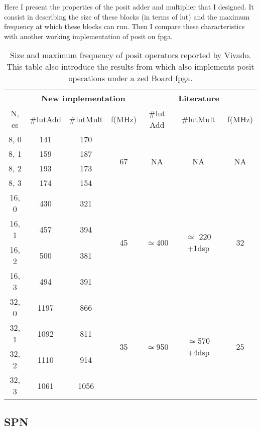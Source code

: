 Here I present the properties of the posit adder and multiplier that I designed. It consist in describing the size of these blocks (in terms of \gls{lut}) and the maximum frequency at which these blocks can run. Then I compare these characteristics with another working implementation of posit on \gls{fpga}.

\begin{table}[!ht]
\centering
\caption{Size and maximum frequency of posit operators reported by Vivado. This table also introduce the results from \cite{other_fpga} which also implements posit operations under a zed Board \gls{fpga}.}
	\label{tab:res_add}
	\begin{tabular}{|c||c|c|c||c|c|c|}
	\hline
		& \multicolumn{3}{c||}{New implementation} & \multicolumn{3}{c|}{Literature \cite{other_fpga}} \\ \hline
		N, es & \#\gls{lut}Add & \#\gls{lut}Mult & f(MHz) & \#\gls{lut} Add & \#\gls{lut}Mult & f(MHz) \\ \hline
		8, 0 & 141 & 170 & \multirow{4}{*}{67} & \multirow{4}{*}{NA} & \multirow{4}{*}{NA} & \multirow{4}{*}{NA} \\
		8, 1 & 159 & 187 & & & & \\
		8, 2 & 193 & 173 & & & & \\
		8, 3 & 174 & 154 & & & & \\ \hline
		16, 0 & 430 & 321 & \multirow{4}{*}{45} & \multirow{4}{*}{$\simeq$400} & \multirow{4}{*}{\parbox{1.5cm}{$\simeq$ 220 +1\gls{dsp}}} & \multirow{4}{*}{32} \\
		16, 1 & 457 & 394 & & & & \\
		16, 2 & 500 & 381 & & & & \\
		16, 3 & 494 & 391 & & & & \\ \hline
		32, 0 & 1197 & 866 & \multirow{4}{*}{35} & \multirow{4}{*}{$\simeq$950} & \multirow{4}{*}{\parbox{1.5cm}{$\simeq$570 +4\gls{dsp}}} & \multirow{4}{*}{25} \\
		32, 1 & 1092 & 811 & & & & \\
		32, 2 & 1110 & 914 & & & & \\
		32, 3 & 1061 & 1056 & & & & \\ \hline
 	\end{tabular}
\end{table}

\subsection{SPN}




